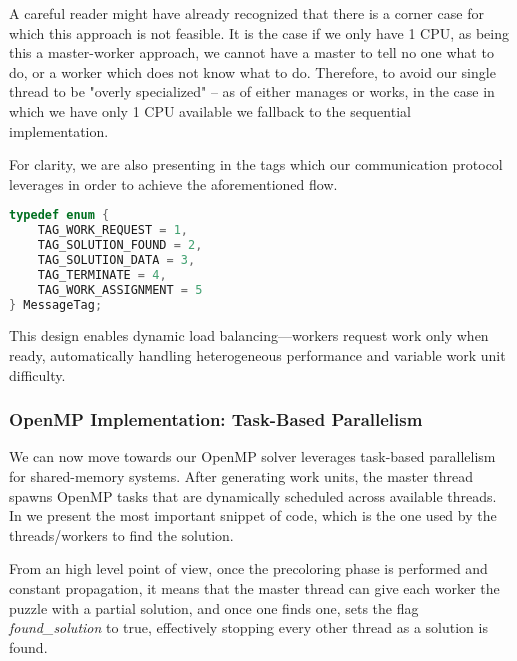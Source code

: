 A careful reader might have already recognized that there is a corner case for which this approach is not feasible. It is the case if we only have 1 CPU, as being this a master-worker approach, we cannot have a master to tell no one what to do, or a worker which does not know what to do. Therefore, to avoid our single thread to be "overly specialized" -- as of either manages or works, in the case in which we have only 1 CPU available we fallback to the sequential implementation.

For clarity, we are also presenting in  the tags which our communication protocol leverages in order to achieve the aforementioned flow.

\begin{lstlisting}[language=C, caption=MPI communication tags, label={listing:message_tags}]
typedef enum {
    TAG_WORK_REQUEST = 1,
    TAG_SOLUTION_FOUND = 2,
    TAG_SOLUTION_DATA = 3,
    TAG_TERMINATE = 4,
    TAG_WORK_ASSIGNMENT = 5
} MessageTag;
\end{lstlisting}
This design enables dynamic load balancing—workers request work only when ready, automatically handling heterogeneous performance and variable work unit difficulty.


\subsubsection{OpenMP Implementation: Task-Based Parallelism}
\label{subsubsec:omp_implementation}
We can now move towards our OpenMP solver leverages task-based parallelism for shared-memory systems. After generating work units, the master thread spawns OpenMP tasks that are dynamically scheduled across available threads. In  we present the most important snippet of code, which is the one used by the threads/workers to find the solution.

From an high level point of view, once the precoloring phase is performed and constant propagation, it means that the master thread can give each worker the puzzle with a partial solution, and once one finds one, sets the flag \textit{found\_solution} to true, effectively stopping every other thread as a solution is found. 


